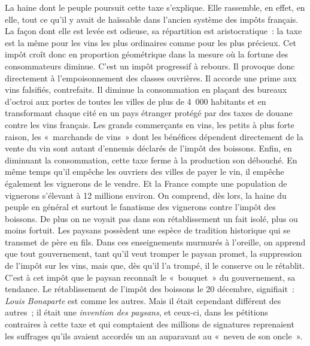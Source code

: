 \documentclass[twoside]{book} %
\begin{document}
La haine dont le peuple poursuit cette taxe s’explique. Elle rassemble, en effet, en elle, tout ce qu’il y avait de haïssable dans l’ancien système des impôts français. La façon dont elle est levée est odieuse, sa répartition est aristocratique : la taxe est la même pour les vins les plus ordinaires comme pour les plus précieux. Cet impôt croît donc en proportion géométrique dans la mesure où la fortune des consommateurs diminue. C’est un impôt progressif à rebours. Il provoque donc directement à l’empoisonnement des classes ouvrières. Il accorde une prime aux vins falsifiés, contrefaits. Il diminue la consommation en plaçant des bureaux d’octroi aux portes de toutes les villes de plus de 4 000 habitants et en transformant chaque cité en un pays étranger protégé par des taxes de douane contre les vins français. Les grands commerçants en vins, les petits à plus forte raison, les « marchands de vins » dont les bénéfices dépendent directement de la vente du vin sont autant d’ennemis déclarés de l’impôt des boissons. Enfin, en diminuant la consommation, cette taxe ferme à la production son débouché. En même temps qu’il empêche les ouvriers des villes de payer le vin, il empêche également les vignerons de le vendre. Et la France compte une population de vignerons s’élevant à 12 millions environ. On comprend, dès lors, la haine du peuple en général et surtout le fanatisme des vignerons contre l’impôt des boissons. De plus on ne voyait pas dans son rétablissement un fait isolé, plus ou moins fortuit. Les paysans possèdent une espèce de tradition historique qui se transmet de père en fils. Dans ces enseignements murmurés à l’oreille, on apprend que tout gouvernement, tant qu’il veut tromper le paysan promet, la suppression de l’impôt sur les vins, mais que, dès qu’il l’a trompé, il le conserve ou le rétablit. C’est à cet impôt que le paysan reconnaît le « bouquet » du gouvernement, sa tendance. Le rétablissement de l’impôt des boissons le 20 décembre, signifiait : \emph{Louis Bonaparte} est comme les autres. Mais il était cependant différent des autres ; il était une \emph{invention des paysans}, et ceux-ci, dans les pétitions contraires à cette taxe et qui comptaient des millions de signatures reprenaient les suffrages qu’ils avaient accordés un an auparavant au « neveu de son oncle ».\par
\end{document}
